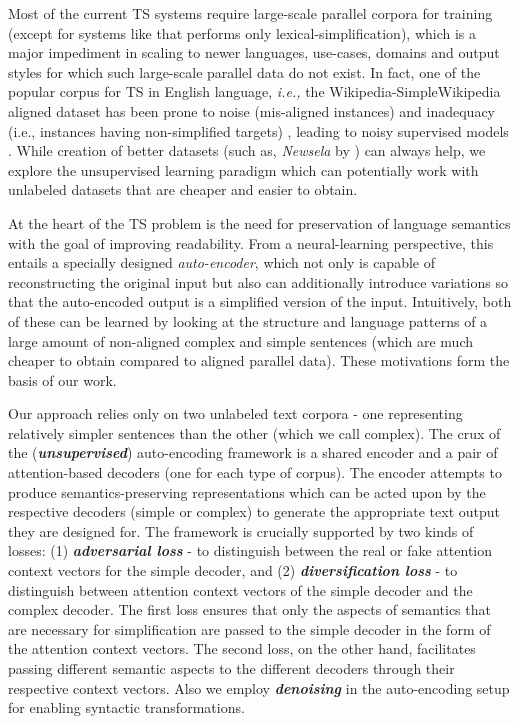 \documentclass[11pt,a4paper]{article}
\begin{document}
Most of the current TS systems require large-scale parallel corpora for training (except for systems like  that  performs only lexical-simplification), which is a major impediment in scaling to newer languages, use-cases, domains and output styles for which such large-scale parallel data do not exist. In fact, one of the popular corpus for TS in English language, \textit{i.e.,} the Wikipedia-SimpleWikipedia aligned dataset has been prone to noise (mis-aligned instances) and inadequacy (i.e., instances having non-simplified targets) \cite{xu2015problems,vstajner2015deeper}, leading to noisy supervised models \cite{wubben2012sentence}. While creation of better datasets (such as, \textit{Newsela} by ) can always help, we explore the unsupervised learning paradigm which can potentially work with unlabeled datasets that are cheaper and easier to obtain. 

At the heart of the TS problem is the need for preservation of language semantics with the goal of improving readability. From a neural-learning perspective, this entails a specially designed \emph{auto-encoder}, which not only is capable of reconstructing the original input but also can additionally introduce variations so that the auto-encoded output is a simplified version of the input. Intuitively, both of these can be learned by looking at the structure and language patterns of a large amount of non-aligned complex and simple sentences (which are much cheaper to obtain compared to aligned parallel data). These motivations form the basis of our work.

Our approach relies only on two unlabeled text corpora - one representing relatively simpler sentences than the other (which we call complex). The crux of the (\emph{\textbf{unsupervised}}) auto-encoding framework is a shared encoder and a pair of attention-based decoders (one for each type of corpus). The encoder attempts to produce semantics-preserving representations which can be acted upon by the respective decoders (simple or complex) to generate the appropriate text output they are designed for. The framework is crucially supported by two kinds of losses: (1) \emph{\textbf{adversarial loss}} - to distinguish between the real or fake attention context vectors for the simple decoder, and (2) \emph{\textbf{diversification loss}} - to distinguish between attention context vectors of the simple decoder and the complex decoder. The first loss ensures that only the aspects of semantics that are necessary for simplification are passed to the simple decoder in the form of the attention context vectors. The second loss, on the other hand, facilitates passing different semantic aspects to the different decoders through their respective context vectors. Also we employ \emph{\textbf{denoising}} in the auto-encoding setup for enabling syntactic transformations.
\end{document}
